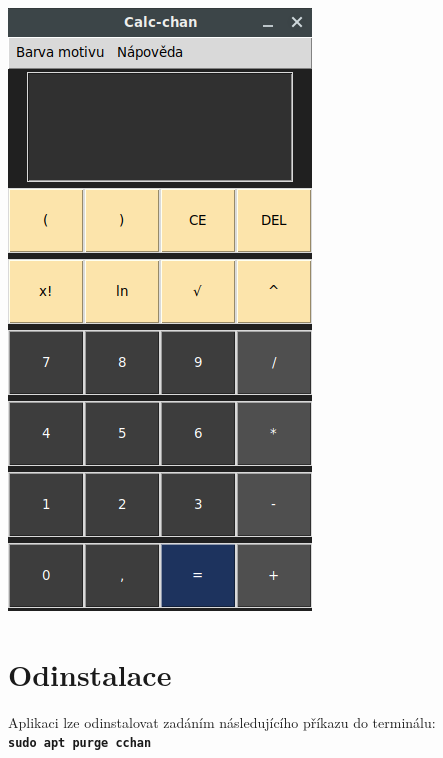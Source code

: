 \documentclass[a4paper, 11pt]{article}
\begin{document}
\begin{center}
\includegraphics[scale=0.5]{screenshot2.png}
\end{center}

\section{Odinstalace}
Aplikaci lze odinstalovat zadáním následujícího příkazu do terminálu:\\
\texttt{\textbf{sudo apt purge cchan}}
\end{document}
